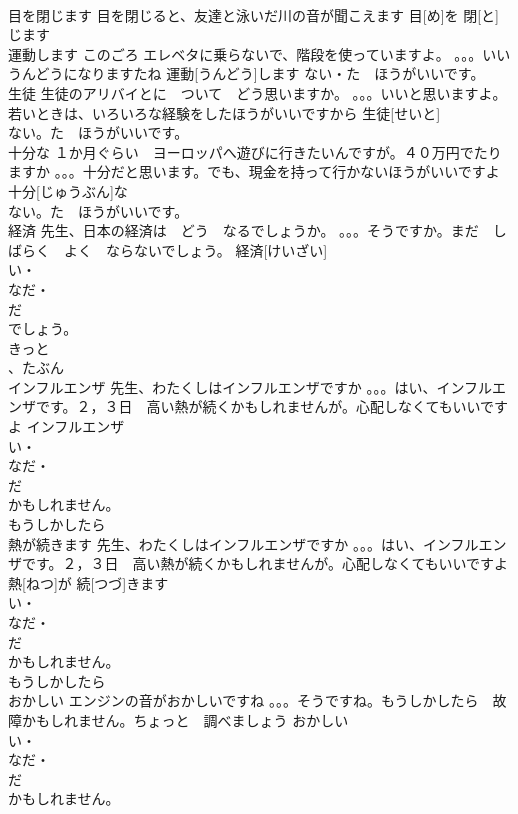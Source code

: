 \documentclass[8pt]{extreport}
\begin{document}
\begin{CJK}{UTF8}{min}
\\	目を閉じます	目を閉じると、友達と泳いだ川の音が聞こえます	目[め]を 閉[と]じます			
\\	運動します	このごろ エレベタに乗らないで、階段を使っていますよ。 。。。いいうんどうになりますたね	運動[うんどう]します				ない・た　ほうがいいです。
\\	生徒	生徒のアリバイとに　ついて　どう思いますか。 。。。いいと思いますよ。若いときは、いろいろな経験をしたほうがいいですから	生徒[せいと]			
\\	ない。た　ほうがいいです。
\\	十分な	１か月ぐらい　ヨーロッパへ遊びに行きたいんですが。４０万円でたりますか 。。。十分だと思います。でも、現金を持って行かないほうがいいですよ	十分[じゅうぶん]な			
\\	ない。た　ほうがいいです。
\\	経済	先生、日本の経済は　どう　なるでしょうか。 。。。そうですか。まだ　しばらく　よく　ならないでしょう。	経済[けいざい]				
\\	い・
\\	なだ・
\\	だ
\\	でしょう。
\\	きっと
\\	、たぶん
\\	インフルエンザ	先生、わたくしはインフルエンザですか 。。。はい、インフルエンザです。２，３日　高い熱が続くかもしれませんが。心配しなくてもいいですよ	インフルエンザ			
\\	い・
\\	なだ・
\\	だ
\\	かもしれません。
\\	もうしかしたら
\\	熱が続きます	先生、わたくしはインフルエンザですか 。。。はい、インフルエンザです。２，３日　高い熱が続くかもしれませんが。心配しなくてもいいですよ	熱[ねつ]が 続[つづ]きます			
\\	い・
\\	なだ・
\\	だ
\\	かもしれません。
\\	もうしかしたら
\\	おかしい	エンジンの音がおかしいですね 。。。そうですね。もうしかしたら　故障かもしれません。ちょっと　調べましょう	おかしい			
\\	い・
\\	なだ・
\\	だ
\\	かもしれません。

\end{CJK}
\end{document}
